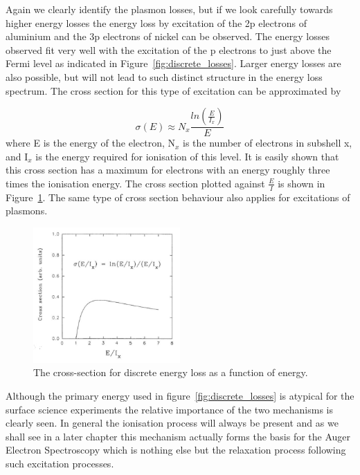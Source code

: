 Again we clearly identify the plasmon losses, but if we look carefully towards higher energy losses the energy loss by excitation of the 2p electrons of aluminium and the 3p electrons of nickel can be observed. The energy losses observed fit very well with the excitation of the p electrons to just above the Fermi level as indicated in Figure~\ref{fig:discrete_losses}. Larger energy losses are also possible, but will not lead to such distinct structure in the energy loss spectrum. The cross section for this type of excitation can be approximated by

\begin{equation}
\sigma(E) \approx N_x\frac{ln(\frac{E}{I_x})}{E}
\end{equation}
where E is the energy of the electron, N$_{x}$ is the number of electrons in subshell x, and I$_{x}$ is the energy required for ionisation of this level. It is easily shown that this cross section has a maximum for electrons with an energy roughly three times the ionisation energy. The cross section plotted against $\frac{E}{I}$ is shown in Figure~\ref{fig:discrete_losses_crosssection}. The same type of cross section behaviour also applies for excitations of plasmons.

\begin{figure}[htbp]
\centering
\includegraphics[width=0.5\textwidth]{figures/02_11}
\caption{The cross-section for discrete energy loss as a function of energy.}
\label{fig:discrete_losses_crosssection}
\end{figure}

Although the primary energy used in figure~\ref{fig:discrete_losses} is atypical for the surface science experiments the relative importance of the two mechanisms is clearly seen. In general the ionisation process will always be present and as we shall see in a later chapter this mechanism actually forms the basis for the Auger Electron Spectroscopy which is nothing else but the relaxation process following such excitation processes.

